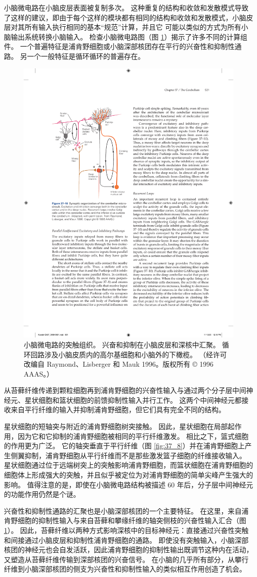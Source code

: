小脑微电路在小脑皮层表面被复制多次。
这种重复的结构和收敛和发散模式导致了这样的建议，即由于每个这样的模块都有相同的结构和收敛和发散模式，小脑皮层对其所有输入执行相同的基本“规范”计算，并且它 可能以类似的方式为所有小脑输出系统转换小脑输入。
检查小脑微电路图（图 \ref{fig:37_10}）揭示了许多不同的计算组件。
一个普遍特征是浦肯野细胞或小脑深部核团存在平行的兴奋性和抑制性通路。 另一个一般特征是循环循环的普遍存在。


\begin{figure}[htbp]
	\centering
	\includegraphics[width=0.5\linewidth]{chap37/fig_37_10}
	\caption{小脑微电路的突触组织。 兴奋和抑制在小脑皮层和深核中汇聚。 循环回路涉及小脑皮质内的高尔基细胞和小脑外的下橄榄。 （经许可改编自 Raymond、Lisberger 和 Mauk 1996。版权所有 © 1996 AAAS。）}
	\label{fig:37_10}
\end{figure}

从苔藓纤维传递到颗粒细胞再到浦肯野细胞的兴奋性输入与通过两个分子层中间神经元、星状细胞和篮状细胞的前馈抑制性输入并行工作。
这两个中间神经元都接收来自平行纤维的输入并抑制浦肯野细胞，但它们具有完全不同的结构。


星状细胞的短轴突与附近的浦肯野细胞树突接触。
因此，星状细胞在局部起作用，因为它和它抑制的浦肯野细胞被相同的平行纤维激发。
相比之下，篮式细胞的作用更为广泛。 它的轴突垂直于平行纤维（图 \ref{fig:37_8}）并在浦肯野细胞上产生侧翼抑制，浦肯野细胞从平行纤维而不是那些激发篮子细胞的纤维接收输入。
星状细胞通过位于远端树突上的突触影响浦肯野细胞，而篮状细胞在浦肯野细胞的细胞体上形成强大的突触，并且似乎被定位为对浦肯野细胞的简单尖峰产生强大的影响。
值得注意的是，即使在小脑微电路结构被描述 60 年后，分子层中间神经元的功能作用仍然是个谜。


兴奋性和抑制性通路的汇聚也是小脑深部核团的一个主要特征。
在这里，来自浦肯野细胞的抑制性输入与来自苔藓和攀缘纤维的轴突侧枝的兴奋性输入汇合（图 \ref{fig:37_10}）。
因此，苔藓纤维以两种方式影响深核中的目标神经元：直接通过兴奋性突触和间接通过小脑皮层和抑制性浦肯野细胞的通路。
即使没有突触输入，小脑深部核团的神经元也会自发活跃，因此浦肯野细胞的抑制性输出既调节这种内在活动，又塑造从苔藓纤维传输到深部核团的兴奋信号。
在小脑的几乎所有部分，从攀行纤维到小脑深部核团的侧支为兴奋性和抑制性输入的类似相互作用创造了机会。


